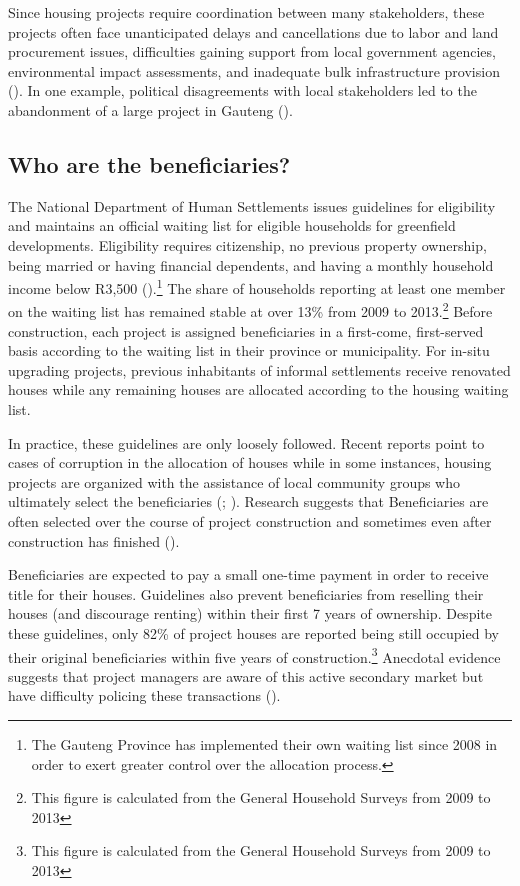 \documentclass[12pt]{article}
\begin{document}
Since housing projects require coordination between many stakeholders, these projects often face unanticipated delays and cancellations due to labor and land procurement issues, difficulties gaining support from local government agencies, environmental impact assessments, and inadequate bulk infrastructure provision (\cite{dhsreports}).  In one example, political disagreements with local stakeholders led to the abandonment of a large project in Gauteng (\cite{protest}).

\subsection{Who are the beneficiaries?}

The National Department of Human Settlements issues guidelines for eligibility and maintains an official waiting list for eligible households for greenfield developments.  Eligibility requires citizenship, no previous property ownership, being married or having financial dependents, and having a monthly household income below R3,500 (\cite{seriq}).\footnote{The Gauteng Province has implemented their own waiting list since 2008 in order to exert greater control over the allocation process.}  The share of households reporting at least one member on the waiting list has remained stable at over 13\% from 2009 to 2013.\footnote{This figure is calculated from the General Household Surveys from 2009 to 2013}  Before construction, each project is assigned beneficiaries in a first-come, first-served basis according to the waiting list in their province or municipality.  For in-situ upgrading projects, previous inhabitants of informal settlements receive renovated houses while any remaining houses are allocated according to the housing waiting list.

In practice, these guidelines are only loosely followed.  Recent reports point to cases of corruption in the allocation of houses while in some instances, housing projects are organized with the assistance of local community groups who ultimately select the beneficiaries (\cite{seriq}; \cite{casestudytinazonke}).  Research suggests that Beneficiaries are often selected over the course of project construction and sometimes even after construction has finished (\cite{seriq}).

Beneficiaries are expected to pay a small one-time payment in order to receive title for their houses.  Guidelines also prevent beneficiaries from reselling their houses (and discourage renting) within their first 7 years of ownership.  Despite these guidelines, only 82\% of project houses are reported being still occupied by their original beneficiaries within five years of construction.\footnote{This figure is calculated from the General Household Surveys from 2009 to 2013}  Anecdotal evidence suggests that project managers are aware of this active secondary market but have difficulty policing these transactions (\cite{resale}).
\end{document}
